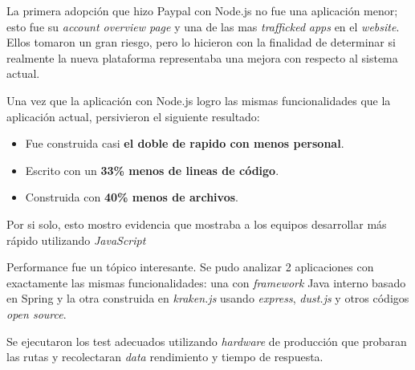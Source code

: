 La primera adopción que hizo Paypal con Node.js no fue una aplicación menor; esto fue su \textit{account overview page} y una de las mas \textit{trafficked} \textit{apps} en el \textit{website}. Ellos tomaron un gran riesgo, pero lo hicieron con la finalidad de determinar si realmente la nueva plataforma representaba una mejora con respecto al sistema actual.

Una vez que la aplicación con Node.js logro las mismas funcionalidades que la aplicación actual, persivieron el siguiente resultado:

\begin{itemize}
\item Fue construida casi \textbf{el doble de rapido con menos personal}.
\item Escrito con un \textbf{33\% menos de lineas de código}.
\item Construida con \textbf{40\% menos de archivos}.
\end{itemize}

Por si solo, esto mostro evidencia que mostraba a los equipos desarrollar más rápido utilizando \textit{JavaScript}

Performance fue un tópico interesante. Se pudo analizar 2 aplicaciones con exactamente las mismas funcionalidades: una con \textit{framework} Java interno basado en Spring y la otra construida en \textit{kraken.js} usando \textit{express}, \textit{dust.js} y otros códigos \textit{open source}.

Se ejecutaron los test adecuados utilizando \textit{hardware} de producción que probaran las rutas y recolectaran \textit{data} rendimiento y tiempo de respuesta.

